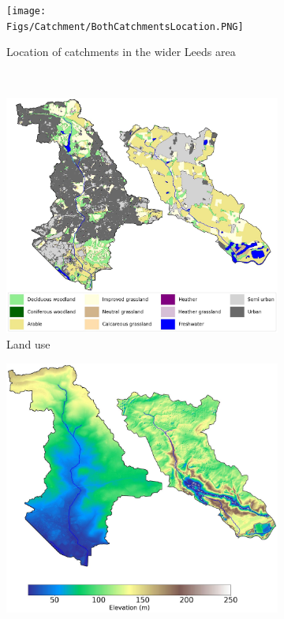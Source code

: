 \documentclass[APA,Times2COL]{WileyNJDv5}
\begin{document}
\begin{figure}[!t] 
\centering
\begin{subfigure}[H]{0.45\linewidth}
   \centering
   \texttt{[image: Figs/Catchment/BothCatchmentsLocation.PNG]}
   \caption{Location of catchments in the wider Leeds area }
   \label{fig:catchment_locations}
\end{subfigure}
\\[\baselineskip]
\begin{subfigure}{0.45\linewidth}
   \centering
   \includegraphics[width=\linewidth]{Figs/Catchment/LandCover_BothCatchments.jpg}
   \caption{Land use}
   \label{fig:catchment_landcover} 
\end{subfigure}
\hfill
\begin{subfigure}{0.45\linewidth}
   \centering
   \includegraphics[width=\linewidth]{Figs/Catchment/Terrain_BothCatchments.jpg}

\end{subfigure}
\end{figure}
\end{document}
